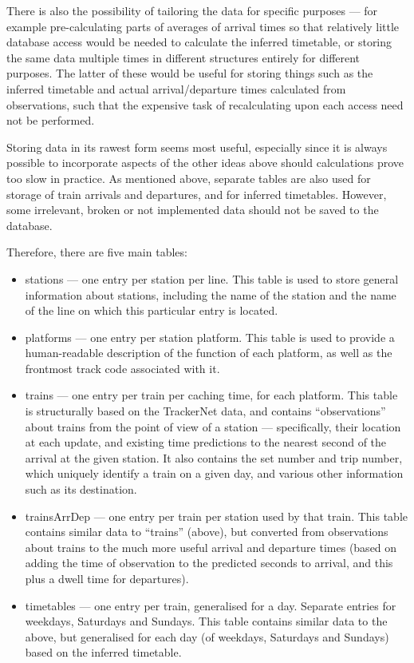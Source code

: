 \documentclass[a4paper,12pt,twoside]{report}
\begin{document}
There is also the possibility of tailoring the data for specific purposes ---
for example pre-calculating parts of averages of arrival times so that
relatively little database access would be needed to calculate the inferred
timetable, or storing the same data multiple times in different structures
entirely for different purposes. The latter of these would be useful for
storing things such as the inferred timetable and actual arrival/departure
times calculated from observations, such that the expensive task of
recalculating upon each access need not be performed.

Storing data in its rawest form seems most useful, especially since it is
always possible to incorporate aspects of the other ideas above should
calculations prove too slow in practice. As mentioned above, separate tables
are also used for storage of train arrivals and departures, and for inferred
timetables. However, some irrelevant, broken or not implemented data should not
be saved to the database.

Therefore, there are five main tables:
\begin{itemize}
  \item stations --- one entry per station per line. This table is used to
    store general information about stations, including the name of the station
    and the name of the line on which this particular entry is located.
  \item platforms --- one entry per station platform. This table is used to
    provide a human-readable description of the function of each platform, as
    well as the frontmost track code associated with it.
  \item trains --- one entry per train per caching time, for each platform.
    This table is structurally based on the TrackerNet data, and contains
    ``observations'' about trains from the point of view of a station ---
    specifically, their location at each update, and existing time predictions
    to the nearest second of the arrival at the given station. It also contains
    the set number and trip number, which uniquely identify a train on a given
    day, and various other information such as its destination.
  \item trainsArrDep --- one entry per train per station used by that train.
    This table contains similar data to ``trains'' (above), but converted from
    observations about trains to the much more useful arrival and departure
    times (based on adding the time of observation to the predicted seconds to
    arrival, and this plus a dwell time for departures).
  \item timetables --- one entry per train, generalised for a day. Separate
    entries for weekdays, Saturdays and Sundays. This table contains similar
    data to the above, but generalised for each day (of weekdays, Saturdays and
    Sundays) based on the inferred timetable.
\end{itemize}
\end{document}
